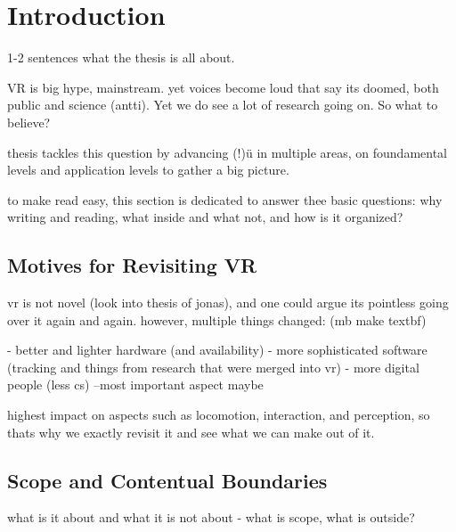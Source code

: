 %
\chapter{Introduction}
\label{sec:intro}



1-2 sentences what the thesis is all about. 


VR is big hype, mainstream. yet voices become loud that say its doomed, both public and science (antti). Yet we do see a lot of research going on. So what to believe?

thesis tackles this question by advancing (!)ü in multiple areas, on foundamental levels and application levels to gather a big picture. 

to make read easy, this section is dedicated to answer thee basic questions: why writing and reading, what inside and what not, and how is it organized?




\section{Motives for Revisiting VR}

vr is not novel (look into thesis of jonas), and one could argue its pointless going over it again and again. however, multiple things changed: (mb make textbf)

- better and lighter hardware (and availability)
- more sophisticated software (tracking and things from research that were merged into vr)
- more digital people (less cs) --most important aspect maybe

highest impact on aspects such as locomotion, interaction, and perception, so thats why we exactly revisit it and see what we can make out of it.







\section{Scope and Contentual Boundaries}
what is it about and what it is not about
- what is scope, what is outside?

